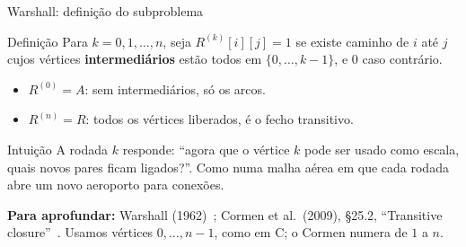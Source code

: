 \documentclass[aspectratio=169,xcolor=table]{beamer}
\newcommand{\fonte}[1]{%
  \vfill
  {\tiny\color{gray!55!black}\textbf{Para aprofundar:} #1\par}%
}
\begin{document}
\begin{frame}{Warshall: definição do subproblema}
  \begin{block}{Definição}
    \scriptsize Para $k = 0,1,\dots,n$, seja $R^{(k)}[i][j] = 1$ se existe caminho de $i$ até
    $j$ cujos vértices \textbf{intermediários} estão todos em $\{0,\dots,k-1\}$, e $0$ caso
    contrário.
    \begin{itemize}\scriptsize
      \item $R^{(0)} = A$: sem intermediários, só os arcos.
      \item $R^{(n)} = R$: todos os vértices liberados, é o fecho transitivo.
    \end{itemize}
  \end{block}
  \begin{exampleblock}{Intuição}
    \scriptsize A rodada $k$ responde: ``agora que o vértice $k$ pode ser usado como escala,
    quais novos pares ficam ligados?''. Como numa malha aérea em que cada rodada abre um novo
    aeroporto para conexões.
  \end{exampleblock}
  \fonte{Warshall (1962)~\cite{warshall1962theorem}; Cormen et al.\ (2009), \S 25.2,
    ``Transitive closure''~\cite{cormen2009introduction}. Usamos vértices $0,\dots,n-1$, como em C;
    o Cormen numera de $1$ a $n$.}
\end{frame}
\end{document}
